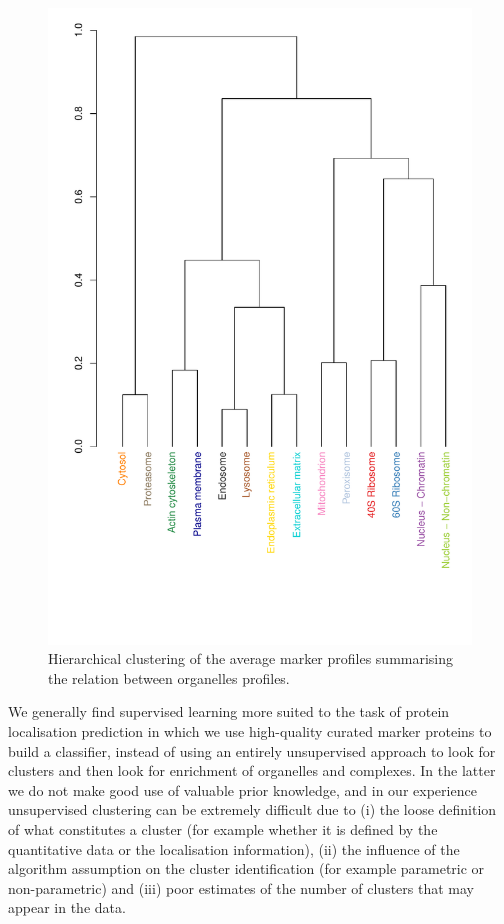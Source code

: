 \begin{figure}[!ht]
  \centering
\begin{knitrout}
\color{fgcolor}\begin{kframe}
\begin{alltt}
\hlstd{(} \hlstd{=} \hlstd{(}\hlstd{,} \hlstd{,} \hlstd{,} \hlstd{))} 
\end{alltt}
\end{kframe}
\includegraphics[width=.5\textwidth,angle=-90]{figure/hclust-1} 

\end{knitrout}
  \caption{Hierarchical clustering of the average marker profiles summarising the relation between organelles profiles.}
  \label{fig:mrkHclust}
\end{figure}

We generally find supervised learning more suited to the task of
protein localisation prediction in which we use high-quality curated
marker proteins to build a classifier, instead of using an entirely
unsupervised approach to look for clusters and then look for
enrichment of organelles and complexes. In the latter we do not make
good use of valuable prior knowledge, and in our experience
unsupervised clustering can be extremely difficult due to
(i) the loose definition of what constitutes a cluster (for example 
whether it is defined by the quantitative data or the localisation 
information), (ii) the influence of the algorithm assumption on the 
cluster identification (for example parametric or non-parametric) 
and (iii) poor estimates of the number of clusters that may appear 
in the data.

